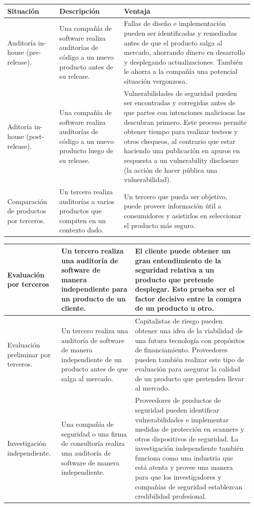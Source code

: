 \begin{tabular}{|p{4.3cm}|p{4.3cm}|p{4.3cm}|}
    \hline
    \textbf{Situación} & \textbf{Descripción} & \textbf{Ventaja} \\
    \hline
    Auditoría in-house (pre-release). & Una compañía de software realiza auditorías de código a un nuevo producto antes de su release. & Fallas de diseño e implementación pueden ser identificadas y remediadas antes de que el producto salga al mercado, ahorrando dinero en desarrollo y desplegando actualizaciones. También le ahorra a la compañía una potencial situación vergonzosa. \\
    \hline
    Aditoría in-house (post-release). & Una compañía de software realiza auditorías de código a un nuevo producto luego de su release. & 
    Vulnerabilidades de seguridad pueden ser encontradas y corregidas antes de que partes con intenciones maliciosas las descubran primero. Este proceso permite obtener tiempo para realizar testeos y otros chequeos, al contrario que estar haciendo una publicación en apuros en respuesta a un vulnerability disclosure (la acción de hacer pública una vulnerabilidad). \\
    \hline
    Comparación de productos por terceros. & Un tercero realiza auditorías a varios productos que compiten en un contexto dado. & Un tercero que pueda ser objetivo, puede proveer información útil a consumidores y asistirlos en seleccionar el producto más seguro. \\
    \hline
\end{tabular}
\pagebreak


\begin{tabular}{|p{4.3cm}|p{4.3cm}|p{4.3cm}|}
    \hline
    Evaluación por terceros & Un tercero realiza una auditoría de software de manera independiente para un producto de un cliente. & El cliente puede obtener un gran entendimiento de la seguridad relativa a un producto que pretende desplegar. Esto prueba ser el factor decisivo entre la compra de un producto u otro. \\
    \hline
    Evaluación preliminar por terceros. & Un tercero realiza una auditoría de software de manera independiente de un producto antes de que salga al mercado. & Capitalistas de riesgo pueden obtener una idea de la viabilidad de una futura tecnología con propósitos de financiamiento. Proveedores pueden también realizar este tipo de evaluación para asegurar la calidad de un producto que pretenden llevar al mercado. \\
    \hline
    Investigación independiente. & Una compañía de seguridad o una firma de consultoría realiza una auditoría de software de manera independiente. & Proveedores de productos de seguridad pueden identificar vulnerabilidades e implementar medidas de protección en scanners y otros dispositivos de seguridad. La investigación independiente también funciona como una industria que está atenta y provee una manera para que los investigadores y compañías de seguridad establezcan credibilidad profesional. \\
    \hline
\end{tabular}

